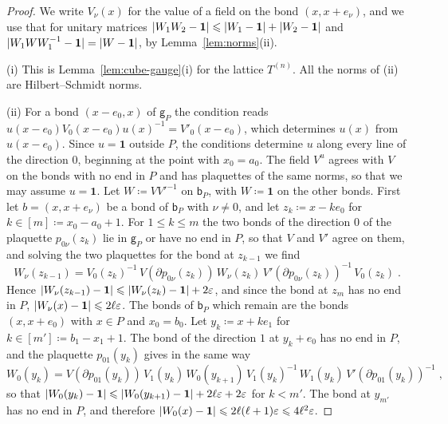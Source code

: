 \documentclass[11pt]{preprint}
\newcommand{\id}{\mathbf 1}
\DeclarePairedDelimiter{\abs}{\lvert}{\rvert}
\numberwithin{equation}{section}
\begin{document}
\begin{proof}
We write $V_\nu(x)$ for the value of a field on the bond $(x, x + e_\nu)$, and we use that for unitary matrices $\abs{W_1W_2 - \id} \leqslant \abs{W_1 - \id} + \abs{W_2 - \id}$ and $\abs{W_1WW_1^{-1} - \id} = \abs{W - \id}$, by Lemma~\ref{lem:norms}(ii).

(i) This is Lemma~\ref{lem:cube-gauge}(i) for the lattice $T^{(n)}$. All the norms of (ii) are Hilbert--Schmidt norms.

(ii) For a bond $(x - e_0, x)$ of $\mathsf g_P$ the condition reads $u(x - e_0)V_0(x - e_0)u(x)^{-1} = V'_0(x - e_0)$, which determines $u(x)$ from $u(x - e_0)$. Since $u = \id$ outside $P$, the conditions determine $u$ along every line of the direction $0$, beginning at the point with $x_0 = a_0$. The field $V^u$ agrees with $V$ on the bonds with no end in $P$ and has plaquettes of the same norms, so that we may assume $u = \id$. Let $W \coloneqq VV'^{-1}$ on $\mathsf b_P$, with $W \coloneqq \id$ on the other bonds. First let $b = (x, x + e_\nu)$ be a bond of $\mathsf b_P$ with $\nu \neq 0$, and let $z_k \coloneqq x - ke_0$ for $k \in [m] \coloneqq x_0 - a_0 + 1$. For $1 \leqslant k \leqslant m$ the two bonds of the direction $0$ of the plaquette $p_{0\nu}(z_k)$ lie in $\mathsf g_P$ or have no end in $P$, so that $V$ and $V'$ agree on them, and solving the two plaquettes for the bond at $z_{k-1}$ we find
\[
    W_\nu(z_{k-1}) = V_0(z_k)^{-1}\,V(\partial p_{0\nu}(z_k))\,W_\nu(z_k)\,V'(\partial p_{0\nu}(z_k))^{-1}\,V_0(z_k)\;.
\]
Hence $\abs{W_\nu(z_{k-1}) - \id} \leqslant \abs{W_\nu(z_k) - \id} + 2\varepsilon$, and since the bond at $z_m$ has no end in $P$, $\abs{W_\nu(x) - \id} \leqslant 2\ell\varepsilon$. The bonds of $\mathsf b_P$ which remain are the bonds $(x, x + e_0)$ with $x \in P$ and $x_0 = b_0$. Let $y_k \coloneqq x + ke_1$ for $k \in [m'] \coloneqq b_1 - x_1 + 1$. The bond of the direction $1$ at $y_k + e_0$ has no end in $P$, and the plaquette $p_{01}(y_k)$ gives in the same way
\[
    W_0(y_k) = V(\partial p_{01}(y_k))\,V_1(y_k)\,W_0(y_{k+1})\,V_1(y_k)^{-1}\,W_1(y_k)\,V'(\partial p_{01}(y_k))^{-1}\;,
\]
so that $\abs{W_0(y_k) - \id} \leqslant \abs{W_0(y_{k+1}) - \id} + 2\ell\varepsilon + 2\varepsilon$ for $k < m'$. The bond at $y_{m'}$ has no end in $P$, and therefore $\abs{W_0(x) - \id} \leqslant 2\ell(\ell + 1)\varepsilon \leqslant 4\ell^2\varepsilon$.


\end{proof}
\end{document}
